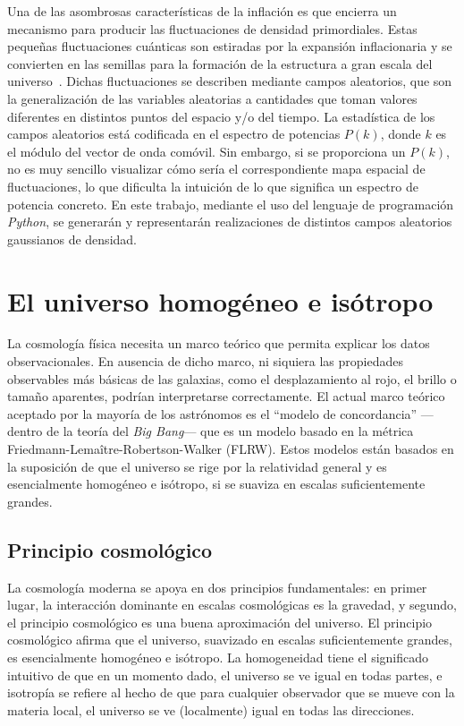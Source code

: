Una de las asombrosas características de la inflación es que encierra un mecanismo para producir las fluctuaciones de densidad primordiales. Estas pequeñas fluctuaciones cuánticas son estiradas por la expansión inflacionaria y se convierten en las semillas para la formación de la estructura a gran escala del universo~\cite{Mukhanov1981,bardeen1983spontaneous,hawking1982development,starobinsky1982dynamics,guth1985quantum}. Dichas fluctuaciones se describen mediante campos aleatorios, que son la generalización de las variables aleatorias a cantidades que toman valores diferentes en distintos puntos del espacio y/o del tiempo. La estadística de los campos aleatorios está codificada en el espectro de potencias \(P(k)\), donde \(k\) es el módulo del vector de onda comóvil.
\newpage
Sin embargo, si se proporciona un \(P(k)\), no es muy sencillo visualizar cómo sería el correspondiente mapa espacial de fluctuaciones, lo que dificulta la intuición de lo que significa un espectro de potencia concreto. En este trabajo, mediante el uso del lenguaje de programación \textit{Python}, se generarán y representarán realizaciones de distintos campos aleatorios gaussianos de densidad.
\clearpage
\section{El universo homogéneo e isótropo}\label{sec::homogeneo}
La cosmología física necesita un marco teórico que permita explicar los datos observacionales. En ausencia de dicho marco, ni siquiera las propiedades observables más básicas de las galaxias, como el desplazamiento al rojo, el brillo o tamaño aparentes, podrían interpretarse correctamente. El actual marco teórico aceptado por la mayoría de los astrónomos es el ``modelo de concordancia'' ---dentro de la teoría del \textit{Big Bang}--- que es un modelo basado en la métrica Friedmann-Lemaître-Robertson-Walker (FLRW). Estos modelos están basados en la suposición de que el universo se rige por la relatividad general y es esencialmente homogéneo e isótropo, si se suaviza en escalas suficientemente grandes.
\subsection{Principio cosmológico}
La cosmología moderna se apoya en dos principios fundamentales: en primer lugar, la interacción dominante en escalas cosmológicas es la gravedad, y segundo, el principio cosmológico es una buena aproximación del universo. El principio cosmológico afirma que el universo, suavizado en escalas suficientemente grandes, es esencialmente homogéneo e isótropo. La homogeneidad tiene el significado intuitivo de que en un momento dado, el universo se ve igual en todas partes, e isotropía se refiere al hecho de que para cualquier observador que se mueve con la materia local, el universo se ve (localmente) igual en todas las direcciones.
